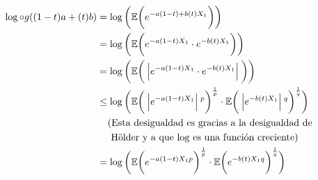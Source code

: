     \begin{align}
        \log\circ g ((1-t)a + (t)b)     &=       \log\bigg( \E\bigg(e^{-a(1-t) + b(t) X_1}\bigg) \bigg)                              \\
                                        &=       \log\bigg( \E\bigg(e^{-a(1-t) X_1} \cdot e^{-b(t) X_1}\bigg) \bigg)                 \\
                                        &=       \log\bigg( \E\bigg(\abs{e^{-a(1-t) X_1} \cdot e^{-b(t) X_1}}\bigg) \bigg)           \\
                                        &\leq    \log\bigg(
                                                            \E
                                                                \bigg(
                                                                    \abs{e^{-a(1-t) X_1}}^p
                                                                \bigg)^{\frac{1}{p}} 
                                                        \cdot 
                                                            \E
                                                                \bigg(
                                                                    \abs{e^{-b(t) X_1}}^q
                                                                \bigg)^\frac{1}{q}
                                                    \bigg)                                                                          \\
                                        &\lcomment{Esta desigualdad es gracias a la desigualdad de }                           \\
                                        &\rcomment{Hölder y a que $\log$ es una función creciente}                            \\
                                        &=      \log\bigg( 
                                                            \E
                                                                \bigg(
                                                                    e^{-a(1-t) X_1 p}
                                                                \bigg)^{\frac{1}{p}} 
                                                        \cdot     
                                                            \E
                                                                \bigg(
                                                                    e^{-b(t) X_1 q}
                                                                \bigg)^\frac{1}{q}
                                                     \bigg)                                                                         \\

\end{align}
